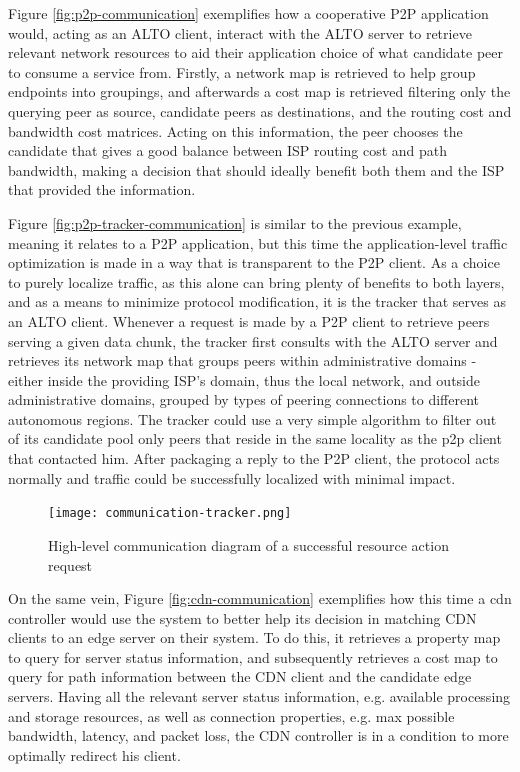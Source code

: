     Figure \ref{fig:p2p-communication} exemplifies how a cooperative P2P application would, acting as an ALTO client, interact with the ALTO server to retrieve relevant network resources to aid their application choice of what candidate peer to consume a service from.
    Firstly, a network map is retrieved to help group endpoints into groupings, and afterwards a cost map is retrieved filtering only the querying peer as source, candidate peers as destinations, and the routing cost and bandwidth cost matrices.
    Acting on this information, the peer chooses the candidate that gives a good balance between ISP routing cost and path bandwidth, making a decision that should ideally benefit both them and the ISP that provided the information.

    Figure \ref{fig:p2p-tracker-communication} is similar to the previous example, meaning it relates to a P2P application, but this time the application-level traffic optimization is made in a way that is transparent to the P2P client.
    As a choice to purely localize traffic, as this alone can bring plenty of benefits to both layers, and as a means to minimize protocol modification, it is the tracker that serves as an ALTO client.
    Whenever a request is made by a P2P client to retrieve peers serving a given data chunk, the tracker first consults with the ALTO server and retrieves its network map that groups peers within administrative domains - either inside the providing ISP's domain, thus the local network, and outside administrative domains, grouped by types of peering connections to different autonomous regions.
    The tracker could use a very simple algorithm to filter out of its candidate pool only peers that reside in the same locality as the p2p client that contacted him.
    After packaging a reply to the P2P client, the protocol acts normally and traffic could be successfully localized with minimal impact.

\begin{figure}[h]
        \centering
        \texttt{[image: communication-tracker.png]}
        \caption{High-level communication diagram of a successful resource action request}
        \label{fig:macro-architecture}
\end{figure}

    On the same vein, Figure \ref{fig:cdn-communication} exemplifies how this time a cdn controller would use the system to better help its decision in matching CDN clients to an edge server on their system.
    To do this, it retrieves a property map to query for server status information, and subsequently retrieves a cost map to query for path information between the CDN client and the candidate edge servers.
    Having all the relevant server status information, e.g. available processing and storage resources, as well as connection properties, e.g. max possible bandwidth, latency, and packet loss, the CDN controller is in a condition to more optimally redirect his client.

